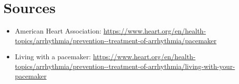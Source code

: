 \section*{Sources}
\begin{itemize}
\item American Heart Association: \url{https://www.heart.org/en/health-topics/arrhythmia/prevention--treatment-of-arrhythmia/pacemaker}
\item Living with a pacemaker: \url{https://www.heart.org/en/health-topics/arrhythmia/prevention--treatment-of-arrhythmia/living-with-your-pacemaker}
\end{itemize}
